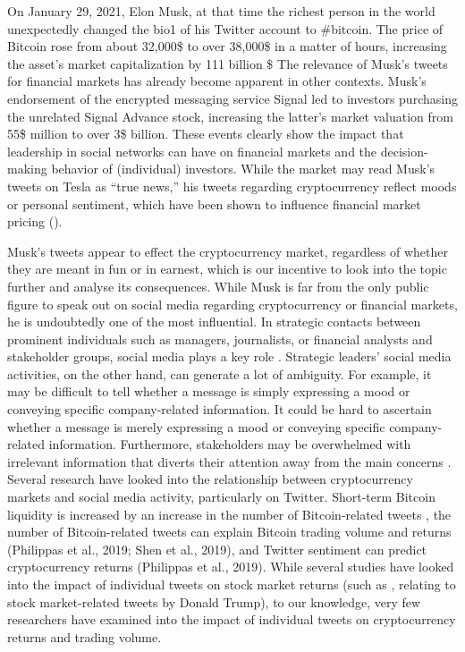 \documentclass[
]{article}
\begin{document}
On January 29, 2021, Elon Musk, at that time the richest person in the
world unexpectedly changed the bio1 of his Twitter account to \#bitcoin.
The price of Bitcoin rose from about 32,000\$ to over 38,000\$ in a
matter of hours, increasing the asset's market capitalization by 111
billion \$ The relevance of Musk's tweets for financial markets has
already become apparent in other contexts. Musk's endorsement of the
encrypted messaging service Signal led to investors purchasing the
unrelated Signal Advance stock, increasing the latter's market valuation
from 55\$ million to over 3\$ billion. These events clearly show the
impact that leadership in social networks can have on financial markets
and the decision-making behavior of (individual) investors. While the
market may read Musk's tweets on Tesla as ``true news,'' his tweets
regarding cryptocurrency reflect moods or personal sentiment, which have
been shown to influence financial market pricing
(\autocite{TwitterMoodPredicts}).

Musk's tweets appear to effect the cryptocurrency market, regardless of
whether they are meant in fun or in earnest, which is our incentive to
look into the topic further and analyse its consequences. While Musk is
far from the only public figure to speak out on social media regarding
cryptocurrency or financial markets, he is undoubtedly one of the most
influential. In strategic contacts between prominent individuals such as
managers, journalists, or financial analysts and stakeholder groups,
social media plays a key role \autocite{HowStrategicLeaders}. Strategic
leaders' social media activities, on the other hand, can generate a lot
of ambiguity. For example, it may be difficult to tell whether a message
is simply expressing a mood or conveying specific company-related
information. It could be hard to ascertain whether a message is merely
expressing a mood or conveying specific company-related information.
Furthermore, stakeholders may be overwhelmed with irrelevant information
that diverts their attention away from the main concerns
\autocite{songSentimentAwareContextualModel2021}. Several research have
looked into the relationship between cryptocurrency markets and social
media activity, particularly on Twitter. Short-term Bitcoin liquidity is
increased by an increase in the number of Bitcoin-related tweets
\autocite{FullArticleHow}, the number of Bitcoin-related tweets can
explain Bitcoin trading volume and returns (Philippas et al., 2019; Shen
et al., 2019), and Twitter sentiment can predict cryptocurrency returns
(Philippas et al., 2019). While several studies have looked into the
impact of individual tweets on stock market returns (such as
\autocite{bransHisThumbEffect2020}, relating to stock market-related
tweets by Donald Trump), to our knowledge, very few researchers have
examined into the impact of individual tweets on cryptocurrency returns
and trading volume.
\end{document}
